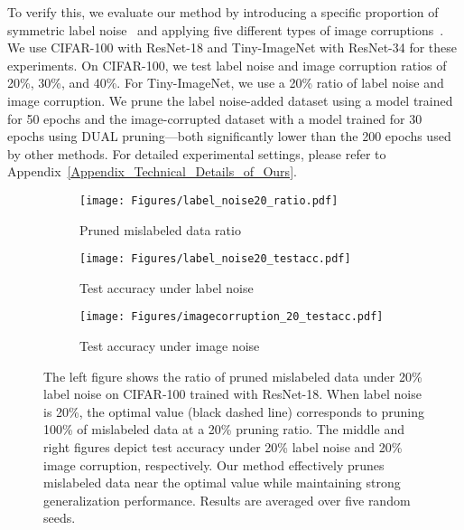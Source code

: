 To verify this, we evaluate our method by introducing a specific proportion of symmetric label noise~\citep{patrini2017making, xia2020robust, li2022selective} and applying five different types of image corruptions~\citep{wang2018iterative, hendrycks2019benchmarking, xia2021instance}. We use CIFAR-100 with ResNet-18 and Tiny-ImageNet with ResNet-34 for these experiments. On CIFAR-100, we test label noise and image corruption ratios of 20\%, 30\%, and 40\%. For Tiny-ImageNet, we use a 20\% ratio of label noise and image corruption. We prune the label noise-added dataset using a model trained for 50 epochs and the image-corrupted dataset with a model trained for 30 epochs using DUAL pruning—both significantly lower than the 200 epochs used by other methods. For detailed experimental settings, please refer to Appendix~\ref{Appendix_Technical_Details_of_Ours}.
\begin{figure*}[t]
    \centering
    \begin{subfigure}{0.325\textwidth}
        \centering
        \texttt{[image: Figures/label\_noise20\_ratio.pdf]}
        \caption{\label{fig:label_noise_20_ratio}Pruned mislabeled data ratio}
    \end{subfigure}
    \hfill
    \begin{subfigure}{0.325\textwidth}
        \centering
        \texttt{[image: Figures/label\_noise20\_testacc.pdf]}
        \caption{\label{fig:label_noise_20_testacc}Test accuracy under label noise}
    \end{subfigure}
    \hfill
    \begin{subfigure}{0.325\textwidth}
        \centering
        \texttt{[image: Figures/imagecorruption\_20\_testacc.pdf]}
    \caption{\label{fig:imagecorruption_20_testacc}Test accuracy under image noise}
    \end{subfigure}
    \caption{\label{fig:labelnoise_main}The left figure shows the ratio of pruned mislabeled data under 20\% label noise on CIFAR-100 trained with ResNet-18. When label noise is 20\%, the optimal value (black dashed line) corresponds to pruning 100\% of mislabeled data at a 20\% pruning ratio. The middle and right figures depict test accuracy under 20\% label noise and 20\% image corruption, respectively. Our method effectively prunes mislabeled data near the optimal value while maintaining strong generalization performance. Results are averaged over five random seeds.}
    \vspace{-10pt}
\end{figure*}
